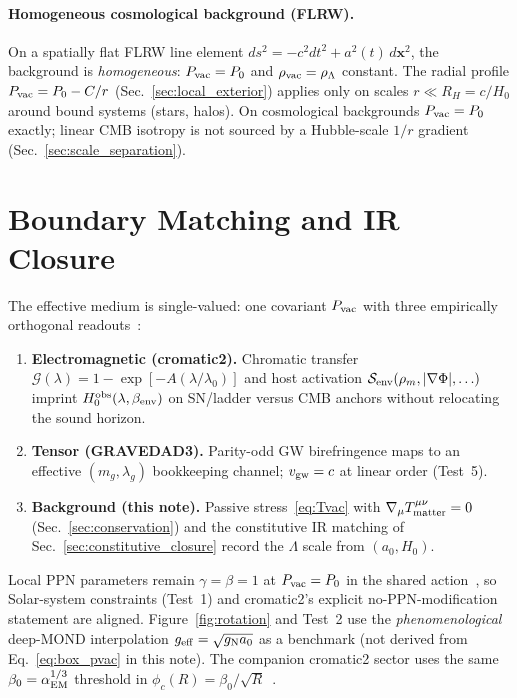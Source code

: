 \documentclass[prd,
               reprint,
               aps,
               preprintnumbers,
               nofootinbib,
               longbibliography,
               floatfix]{revtex4-2}
\begin{document}
\paragraph{Homogeneous cosmological background (FLRW).}
On a spatially flat FLRW line element
$ds^2=-c^2dt^2+a^2(t)\,d\mathbf{x}^2$,
the background is \emph{homogeneous}:
$P_{\rm vac}=P_0$ and $\rho_{\rm vac}=\rho_\Lambda$ constant.
The radial profile $P_{\rm vac}=P_0-C/r$ (Sec.~\ref{sec:local_exterior}) applies
only on scales $r\ll R_H=c/H_0$ around bound systems (stars, halos).
On cosmological backgrounds $P_{\rm vac}=P_0$ exactly; linear CMB
isotropy is not sourced by a Hubble-scale $1/r$ gradient
(Sec.~\ref{sec:scale_separation}).

\section{Boundary Matching and IR Closure}
\label{sec:cromatic2_bridge}

The effective medium is single-valued: one covariant
$P_{\rm vac}$ with three empirically orthogonal
readouts~\cite{cromatic2zenodo,gravedad3zenodo}:
\begin{enumerate}

\item \textbf{Electromagnetic (cro\-ma\-tic2).}
Chromatic transfer $\mathcal{G}(\lambda)=1-\exp[-A(\lambda/\lambda_0)]$
and host activation $\mathcal{S}_{\rm env}(\rho_m,|\nabla\Phi|,\ldots)$
imprint $H_0^{\rm obs}(\lambda,\beta_{\rm env})$ on SN/ladder versus
CMB anchors without relocating the sound horizon.
\item \textbf{Tensor (GRAVEDAD3).}
Parity-odd GW birefringence maps to an effective $(m_g,\lambda_g)$
bookkeeping channel; $v_{\rm gw}=c$ at linear order (Test~5).
\item \textbf{Background (this note).}
Passive stress~\eqref{eq:Tvac} with
$\nabla_\mu T^{\mu\nu}_{\rm matter}=0$
(Sec.~\ref{sec:conservation}) and the constitutive IR matching of
Sec.~\ref{sec:constitutive_closure} record the $\Lambda$ scale from
$(a_0,H_0)$.
\end{enumerate}
Local PPN parameters remain $\gamma=\beta=1$ at $P_{\rm vac}=P_0$
in the shared action~\cite{gravedad3zenodo}, so Solar-system
constraints (Test~1) and cromatic2's explicit no-PPN-modification
statement are aligned.
Figure~\ref{fig:rotation} and Test~2 use the \emph{phenomenological}
deep-MOND interpolation $g_{\rm eff}=\sqrt{g_{\rm N}a_0}$ as a
benchmark (not derived from Eq.~\eqref{eq:box_pvac} in this note).
The companion cromatic2 sector uses the same
$\beta_0=\alpha_{\rm EM}^{1/3}$ threshold in
$\phi_c(R)=\beta_0/\sqrt{R}$~\cite{cromatic2zenodo}.
\end{document}
